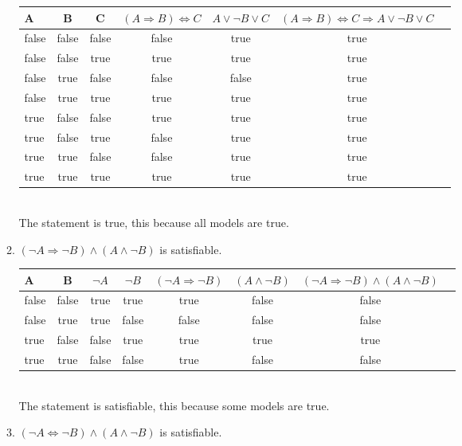\documentclass[paper=a4, fontsize=11pt]{scrartcl} %
\numberwithin{equation}{section} %
\numberwithin{figure}{section} %
\numberwithin{table}{section} %
\begin{document}
\begin{enumerate}
\begin{enumerate}
		\begin{tabular}{l c c c c c c}
			\hline 
			A & B & C & $(A \Rightarrow B) \Leftrightarrow C$ & $A \vee \neg B \vee C$ & $(A \Rightarrow B) \Leftrightarrow C \Rightarrow A \vee \neg B \vee C$ \\
			\hline
			false 	& false 	& false 	& false 	& true 		& true \\
			false 	& false 	& true 		& true	 	& true 		& true \\
			false 	& true 		& false 	& false 	& false 	& true \\
			false 	& true 		& true 		& true 		& true 		& true \\
			true 	& false 	& false 	& true 		& true 		& true \\
			true 	& false 	& true 		& false	 	& true 		& true \\
			true 	& true 		& false 	& false 	& true 		& true \\
			true 	& true 		& true 		& true 		& true 		& true \\
		\end{tabular}
		\\
		
		The statement is true, this because all models are true. \\
		
		\item 
		$(\neg A \Rightarrow \neg B) \wedge (A \wedge \neg B)$ is satisfiable.

		\begin{tabular}{l c c c c c c c}
			\hline 
			A & B & $\neg A$ & $\neg B$ & $(\neg A \Rightarrow \neg B)$ & $(A \wedge \neg B)$ & $(\neg A \Rightarrow \neg B) \wedge (A \wedge \neg B)$ \\
			\hline
			false 	& false 	& true 		& true 		& true  	&false		&false \\
			false 	& true 		& true 		& false	 	& false 	&false		&false \\
			true 	& false 	& false 	& true 		& true 	 	&true		&true\\
			true 	& true 		& false	 	& false		& true 	 	&false		&false\\
		\end{tabular}
		\\
		
		The statement is satisfiable, this because some models are true. \\
		
		\item 
		$(\neg A \Leftrightarrow \neg B) \wedge (A \wedge \neg B)$ is satisfiable.


\end{enumerate}
\end{enumerate}
\end{document}
